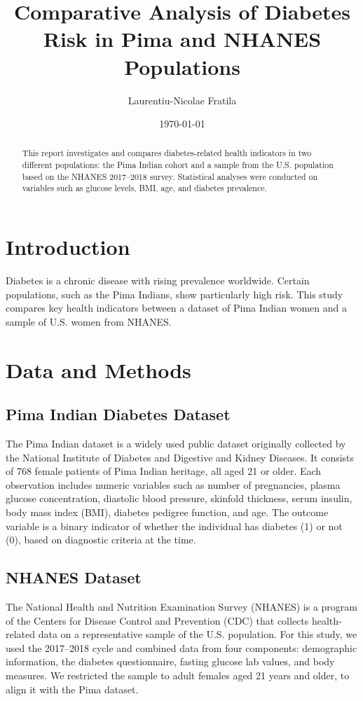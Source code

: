 \documentclass[12pt]{article}
\title{Comparative Analysis of Diabetes Risk in Pima and NHANES Populations}
\author{Laurentiu-Nicolae Fratila}
\date{\today}
\begin{document}
\maketitle

\begin{abstract}
This report investigates and compares diabetes-related health indicators in two different populations: the Pima Indian cohort and a sample from the U.S. population based on the NHANES 2017–2018 survey. Statistical analyses were conducted on variables such as glucose levels, BMI, age, and diabetes prevalence.
\end{abstract}

\section{Introduction}
Diabetes is a chronic disease with rising prevalence worldwide. Certain populations, such as the Pima Indians, show particularly high risk. This study compares key health indicators between a dataset of Pima Indian women and a sample of U.S. women from NHANES.

\section{Data and Methods}

\subsection{Pima Indian Diabetes Dataset}
The Pima Indian dataset is a widely used public dataset originally collected by the National Institute of Diabetes and Digestive and Kidney Diseases. It consists of 768 female patients of Pima Indian heritage, all aged 21 or older. Each observation includes numeric variables such as number of pregnancies, plasma glucose concentration, diastolic blood pressure, skinfold thickness, serum insulin, body mass index (BMI), diabetes pedigree function, and age. The outcome variable is a binary indicator of whether the individual has diabetes (1) or not (0), based on diagnostic criteria at the time.

\subsection{NHANES Dataset}
The National Health and Nutrition Examination Survey (NHANES) is a program of the Centers for Disease Control and Prevention (CDC) that collects health-related data on a representative sample of the U.S. population. For this study, we used the 2017–2018 cycle and combined data from four components: demographic information, the diabetes questionnaire, fasting glucose lab values, and body measures. We restricted the sample to adult females aged 21 years and older, to align it with the Pima dataset.
\end{document}
